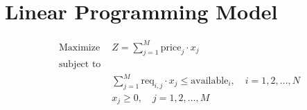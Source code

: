 \documentclass{article}
\begin{document}
\section*{Linear Programming Model}

\begin{align*}
\text{Maximize } & Z = \sum_{j=1}^{M} \text{price}_j \cdot x_j \\
\text{subject to } & \\
& \sum_{j=1}^{M} \text{req}_{i,j} \cdot x_j \leq \text{available}_i, \quad i = 1, 2, \ldots, N \\
& x_j \geq 0, \quad j = 1, 2, \ldots, M
\end{align*}
\end{document}
